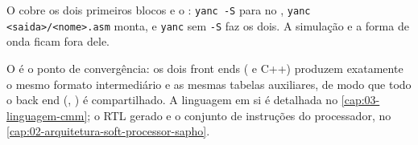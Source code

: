 O  cobre os dois primeiros blocos e o : \lstinline|yanc -S|
para no , \lstinline|yanc <saida>/<nome>.asm| monta, e \lstinline|yanc|
sem \lstinline|-S| faz os dois. A simulação e a forma de onda ficam fora dele.

\begin{nota}
O  é o ponto de convergência: os dois front ends (\cmm{} e C++)
produzem exatamente o mesmo formato intermediário e as mesmas tabelas auxiliares,
de modo que todo o back end (, ) é
compartilhado. A linguagem \cmm{} em si é detalhada no
\autoref{cap:03-linguagem-cmm}; o RTL gerado e o conjunto de instruções do
processador, no \autoref{cap:02-arquitetura-soft-processor-sapho}.
\end{nota}
